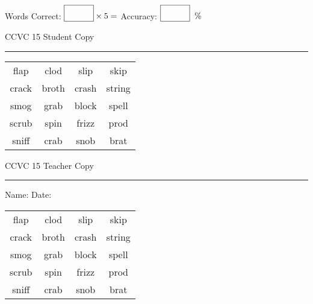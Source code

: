 \documentclass{memoir}
\begin{document}
\small

Words Correct: $\fbox{\phantom{\huge 100}} \times 5 = $ Accuracy: $\fbox{\phantom{\huge 100}}\;\; \%$ 

\vfill

\newpage


\footnotesize \noindent
CCVC 15 \hfill Student Copy
\smallskip
\hrule

\Large

\setlength{\tabcolsep}{14pt}
\def\arraystretch{3}

{\selectfont


\begin{vplace}[0.5]
\begin{center}
\begin{tabular}{cccc}
flap            & clod & slip & skip \\
crack       & broth    & crash & string \\
smog & grab                    & block & spell \\
scrub & spin & frizz & prod \\
sniff & crab        & snob & brat               \\
\end{tabular}
\end{center}
\end{vplace}

}

\newpage

\footnotesize \noindent
CCVC 15 \hfill Teacher Copy
\smallskip
\hrule

\small

\vfill

\noindent
Name: \underline{\hspace{1.75in}} \hfill Date: \underline{\hspace{1in}}

\Large

{\selectfont


\begin{vplace}[0.5]
\begin{center}
\begin{tabular}{cccc}
flap            & clod & slip & skip \\
crack       & broth    & crash & string \\
smog & grab                    & block & spell \\
scrub & spin & frizz & prod \\
sniff & crab        & snob & brat               \\
\end{tabular}
\end{center}
\end{vplace}



}
\end{document}
